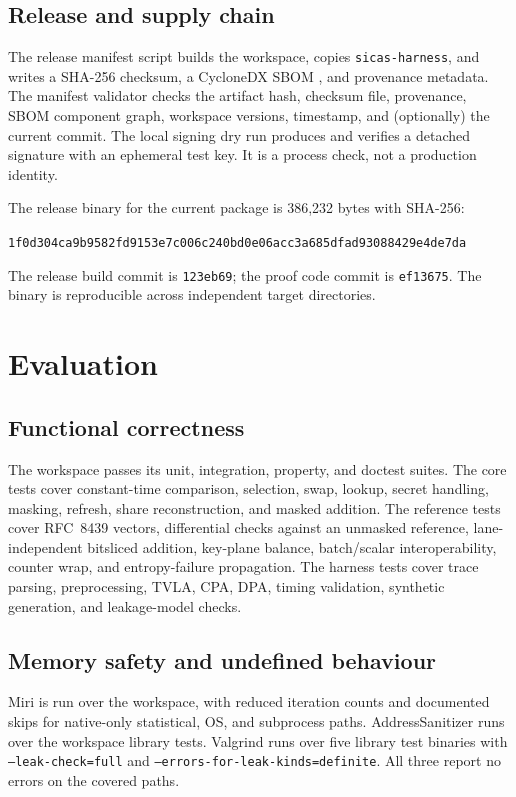 \documentclass[11pt,a4paper]{article}
\newcommand{\code}[1]{\texttt{#1}}
\theoremstyle{plain}
\theoremstyle{definition}
\theoremstyle{remark}
\begin{document}
\subsection{Release and supply chain}

The release manifest script builds the workspace, copies \code{sicas-harness}, and
writes a SHA-256 checksum, a CycloneDX SBOM \citep{cyclonedx}, and provenance metadata.
The manifest validator checks the artifact hash, checksum file, provenance, SBOM
component graph, workspace versions, timestamp, and (optionally) the current commit.
The local signing dry run produces and verifies a detached signature with an ephemeral
test key. It is a process check, not a production identity.

The release binary for the current package is 386{,}232 bytes with SHA-256:
\begin{center}\small
\code{1f0d304ca9b9582fd9153e7c006c240bd0e06acc3a685dfad93088429e4de7da}
\end{center}
The release build commit is \code{123eb69}; the proof code commit is \code{ef13675}.
The binary is reproducible across independent target directories.

\section{Evaluation}\label{sec:evaluation}

\subsection{Functional correctness}

The workspace passes its unit, integration, property, and doctest suites. The core
tests cover constant-time comparison, selection, swap, lookup, secret handling, masking,
refresh, share reconstruction, and masked addition. The reference tests cover RFC~8439
vectors, differential checks against an unmasked reference, lane-independent bitsliced
addition, key-plane balance, batch/scalar interoperability, counter wrap, and
entropy-failure propagation. The harness tests cover trace parsing, preprocessing,
TVLA, CPA, DPA, timing validation, synthetic generation, and leakage-model checks.

\subsection{Memory safety and undefined behaviour}

Miri \citep{miri} is run over the workspace, with reduced iteration counts and
documented skips for native-only statistical, OS, and subprocess paths. AddressSanitizer
\citep{serebryany2012asan} runs over the workspace library tests. Valgrind
\citep{nethercote2007valgrind} runs over five library test binaries with
\code{--leak-check=full} and \code{--errors-for-leak-kinds=definite}. All three report
no errors on the covered paths.
\end{document}
